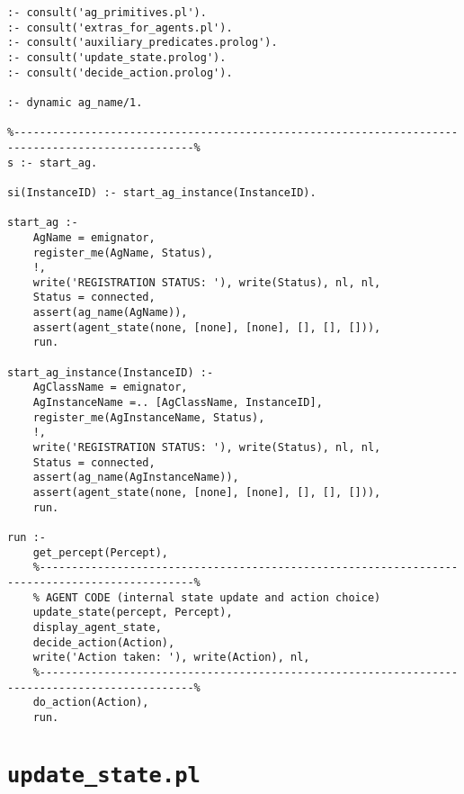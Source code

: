 \documentclass[a4paper,12pt]{report}
\begin{document}
\begin{scriptsize}
\begin{verbatim}
:- consult('ag_primitives.pl').
:- consult('extras_for_agents.pl').
:- consult('auxiliary_predicates.prolog').
:- consult('update_state.prolog').
:- consult('decide_action.prolog').

:- dynamic ag_name/1.

%--------------------------------------------------------------------------------------------------%
s :- start_ag.

si(InstanceID) :- start_ag_instance(InstanceID).

start_ag :- 
    AgName = emignator,
    register_me(AgName, Status),
    !,
    write('REGISTRATION STATUS: '), write(Status), nl, nl,
    Status = connected,
    assert(ag_name(AgName)),
    assert(agent_state(none, [none], [none], [], [], [])),
    run.

start_ag_instance(InstanceID) :-
    AgClassName = emignator,
    AgInstanceName =.. [AgClassName, InstanceID],
    register_me(AgInstanceName, Status),
    !,
    write('REGISTRATION STATUS: '), write(Status), nl, nl,
    Status = connected,
    assert(ag_name(AgInstanceName)),
    assert(agent_state(none, [none], [none], [], [], [])),
    run.

run :-
    get_percept(Percept),
    %----------------------------------------------------------------------------------------------%
    % AGENT CODE (internal state update and action choice)
    update_state(percept, Percept),
    display_agent_state,
    decide_action(Action),
    write('Action taken: '), write(Action), nl,
    %----------------------------------------------------------------------------------------------%
    do_action(Action),
    run.

\end{verbatim}
\end{scriptsize}

\section{\texttt{update\_state.pl}}
\end{document}
